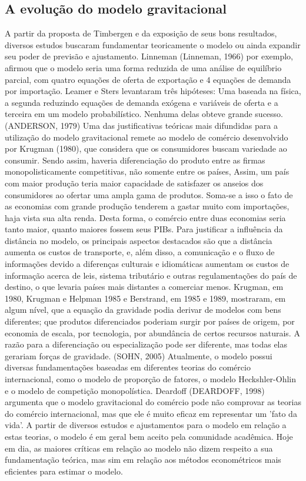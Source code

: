 \documentclass[12pt]{article}
\begin{document}
\subsection{A evolução do modelo gravitacional}
	A partir da proposta de Timbergen e da exposição de seus bons resultados, diversos estudos buscaram fundamentar teoricamente o modelo ou ainda expandir seu poder de previsão e ajustamento. Linneman (Linneman, 1966) por exemplo, afirmou que o modelo seria uma forma reduzida de uma análise de equilíbrio parcial, com quatro equações de oferta de exportação e 4 equações de demanda por importação. Leamer e Sters levantaram três hipóteses: Uma baseada na física, a segunda reduzindo equações de demanda exógena e variáveis de oferta e a terceira em um modelo probabilístico. Nenhuma delas obteve grande sucesso. (ANDERSON, 1979)
    \linebreak Uma das justificativas teóricas mais difundidas para a utilização do modelo gravitacional remete ao modelo de comércio desenvolvido por Krugman (1980), que considera que os consumidores buscam variedade ao consumir. Sendo assim, haveria diferenciação do produto entre as firmas monopolisticamente competitivas, não somente entre os países, Assim, um país com maior produção teria maior capacidade de satisfazer os anseios dos consumidores ao ofertar uma ampla gama de produtos. Soma-se a isso o fato de as economias com grande produção tenderem a gastar muito com importações, haja vista sua alta renda. Desta forma, o comércio entre duas economias seria tanto maior, quanto maiores fossem seus PIBs. Para justificar a influência da distância no modelo, os principais aspectos destacados são que a distância aumenta os custos de transporte, e, além disso, a comunicação e o fluxo de informações devido a diferenças culturais e idiomáticas aumentam os custos de informação acerca de leis, sistema tributário e outras regulamentações do país de destino, o que levaria países mais distantes a comerciar menos. 
    \linebreak Krugman, em 1980, Krugman e Helpman 1985 e Berstrand, em 1985 e 1989, mostraram, em algum nível, que a equação da gravidade podia derivar de modelos com bens diferentes; que produtos diferenciados poderiam surgir por países de origem, por economia de escala, por tecnologia, por abundância de certos recursos naturais. A razão para a diferenciação ou especialização pode ser diferente, mas todas elas gerariam forças de gravidade. \cite{sohn} (SOHN, 2005) \linebreak Atualmente, o modelo possui diversas fundamentações baseadas em diferentes teorias do comércio internacional, como o modelo de proporção de fatores, o modelo Heckshler-Ohlin e o modelo de competição monopolística. Deardoff (DEARDOFF, 1998) argumenta que o modelo gravitacional do comércio pode não comprovar as teorias do comércio internacional, mas que ele é muito eficaz em representar um 'fato da vida'. A partir de diversos estudos e ajustamentos para o modelo em relação a estas teorias, o modelo é em geral bem aceito pela comunidade acadêmica. \linebreak Hoje em dia, as maiores críticas em relação ao modelo não dizem respeito a sua fundamentação teórica, mas sim em relação aos métodos econométricos mais eficientes para estimar o modelo. 
\end{document}
